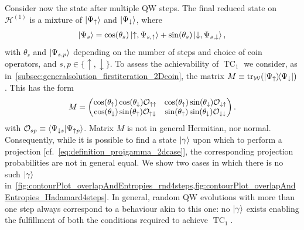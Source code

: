 \documentclass[
	aps, pra,
	superscriptaddress, twocolumn,
	floatfix,
	10pt
]{revtex4-1}
\newcommand{\on}[1]{\operatorname{#1}}
\newcommand{\parTitle}[1]{\noindent{\color{Mahogany}(\emph{#1})}}
\newcommand{\calH}{{\mathcal{H}}}
\newcommand{\calO}{{\mathcal{O}}}
\newcommand{\calU}{{\mathcal{U}}}
\newcommand{\calW}{{\mathcal{W}}}
\newcommand{\commale}[1]{{\textcolor{red} {\it{[Note (Ale): #1]}}}}
\renewcommand{\parTitle}[1]{}
\begin{document}
\parTitle{Multiple steps}
Consider now the state after multiple QW steps.
The final reduced state on $\calH^{(1)}$ is a mixture of $\ket{\Psi_\uparrow}$ and $\ket{\Psi_\downarrow}$, where
\begin{equation}
\begin{aligned}
	\ket{\Psi_s} =
	\cos(\theta_s) \ket{\uparrow,\Psi_{s,\uparrow}} +
	\sin(\theta_s) \ket{\downarrow,\Psi_{s,\downarrow}},
\end{aligned}
\end{equation}
with $\theta_s$ and $\ket{\Psi_{s,p}}$ depending on the number of steps and choice of coin operators, and $s,p\in\{\uparrow,\downarrow\}$.
To assess the achievability of $\on{TC}_1$ we consider, as in~\cref{subsec:generalsolution_firstiteration_2Dcoin}, the matrix
$M\equiv \tr_{\calW}(\ketbra{\Psi_\uparrow}{\Psi_\downarrow})$.
This has the form
\begin{equation}\scalebox{0.97}{$\displaystyle
	M = \begin{pmatrix}
		\cos(\theta_\uparrow)\cos(\theta_\downarrow) \calO_{\uparrow\uparrow} &
		\cos(\theta_\uparrow)\sin(\theta_{\downarrow}) \calO_{\downarrow\uparrow} \\
		\cos(\theta_\downarrow)\sin(\theta_{\uparrow}) \calO_{\uparrow\downarrow} &
		\sin(\theta_\uparrow)\sin(\theta_\downarrow) \calO_{\downarrow\downarrow}
	\end{pmatrix}.
$}\end{equation}
with
$\calO_{sp}\equiv\braket{\Psi_{\downarrow s}}{\Psi_{\uparrow p}}$.
Matrix $M$ is not in general Hermitian, nor normal. Consequently, while it is possible to find a state $\ket\gamma$ upon which to perform a projection [cf.~\cref{eq:definition_projgamma_2dcase}], the corresponding projection probabilities are not in general equal. We show two cases in which there is no such $\ket\gamma$ in~\cref{fig:contourPlot_overlapAndEntropies_rnd4steps,fig:contourPlot_overlapAndEntropies_Hadamard4steps}.
In general, random QW evolutions with more than one step always correspond to a behaviour akin to this one:%
no $\ket\gamma$ exists enabling the fulfillment of both the conditions required to achieve $\on{TC}_1$.
\end{document}
